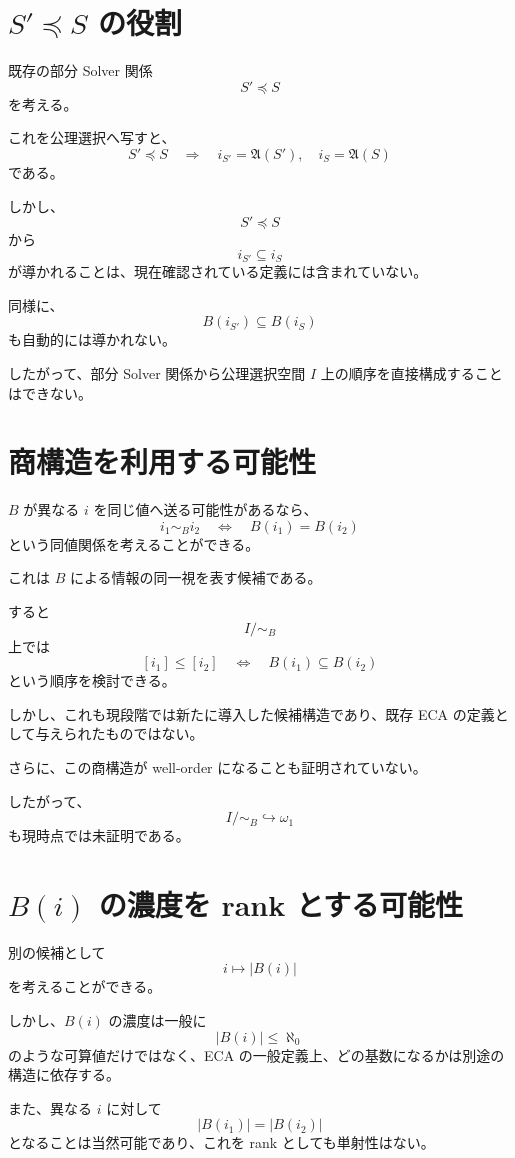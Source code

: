 \documentclass[a4paper,11pt]{article}
\begin{document}
\section{$S'\preceq S$ の役割}

既存の部分 Solver 関係
\[
S'\preceq S
\]
を考える。

これを公理選択へ写すと、
\[
S'\preceq S
\quad\Longrightarrow\quad
i_{S'}=\mathfrak A(S'),
\quad
i_S=\mathfrak A(S)
\]
である。

しかし、
\[
S'\preceq S
\]
から
\[
i_{S'}\subseteq i_S
\]
が導かれることは、現在確認されている定義には含まれていない。

同様に、
\[
B(i_{S'})\subseteq B(i_S)
\]
も自動的には導かれない。

したがって、部分 Solver 関係から公理選択空間 $I$ 上の順序を直接構成することはできない。

\section{商構造を利用する可能性}

$B$ が異なる $i$ を同じ値へ送る可能性があるなら、
\[
i_1\sim_B i_2
\quad\Longleftrightarrow\quad
B(i_1)=B(i_2)
\]
という同値関係を考えることができる。

これは $B$ による情報の同一視を表す候補である。

すると
\[
I/{\sim_B}
\]
上では
\[
[i_1]\leq[i_2]
\quad\Longleftrightarrow\quad
B(i_1)\subseteq B(i_2)
\]
という順序を検討できる。

しかし、これも現段階では新たに導入した候補構造であり、既存 ECA の定義として与えられたものではない。

さらに、この商構造が well-order になることも証明されていない。

したがって、
\[
I/{\sim_B}\hookrightarrow\omega_1
\]
も現時点では未証明である。

\section{$B(i)$ の濃度を rank とする可能性}

別の候補として
\[
i\longmapsto |B(i)|
\]
を考えることができる。

しかし、$B(i)$ の濃度は一般に
\[
|B(i)|\leq\aleph_0
\]
のような可算値だけではなく、ECA の一般定義上、どの基数になるかは別途の構造に依存する。

また、異なる $i$ に対して
\[
|B(i_1)|=|B(i_2)|
\]
となることは当然可能であり、これを rank としても単射性はない。
\end{document}
